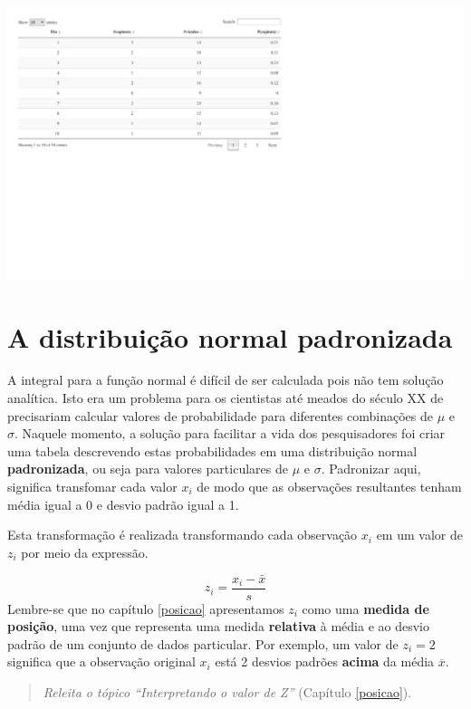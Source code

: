 \documentclass[
]{book}
\begin{document}
\begin{center}\includegraphics{probest-cambientais_files/figure-latex/unnamed-chunk-76-1} \end{center}

\hypertarget{a-distribuiuxe7uxe3o-normal-padronizada}{%
\section{A distribuição normal padronizada}\label{a-distribuiuxe7uxe3o-normal-padronizada}}

A integral para a função normal é difícil de ser calculada pois não tem solução analítica. Isto era um problema para os cientistas até meados do século XX de precisariam calcular valores de probabilidade para diferentes combinações de \(\mu\) e \(\sigma\). Naquele momento, a solução para facilitar a vida dos pesquisadores foi criar uma tabela descrevendo estas probabilidades em uma distribuição normal \textbf{padronizada}, ou seja para valores particulares de \(\mu\) e \(\sigma\). Padronizar aqui, significa transfomar cada valor \(x_i\) de modo que as observações resultantes tenham média igual a 0 e desvio padrão igual a 1.

Esta transformação é realizada transformando cada observação \(x_i\) em um valor de \(z_i\) por meio da expressão.

\[z_i = \frac{x_i - \bar{x}}{s}\]
Lembre-se que no capítulo \ref{posicao} apresentamos \(z_i\) como uma \textbf{medida de posição}, uma vez que representa uma medida \textbf{relativa} à média e ao desvio padrão de um conjunto de dados particular. Por exemplo, um valor de \(z_i = 2\) significa que a observação original \(x_i\) está 2 desvios padrões \textbf{acima} da média \(\overline{x}\).

\begin{quote}
\emph{Releita o tópico ``Interpretando o valor de Z''} (Capítulo \ref{posicao}).
\end{quote}
\end{document}
